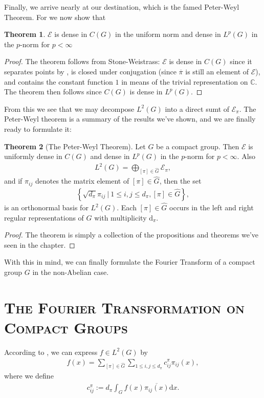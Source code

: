 \documentclass[10pt,twoside,openany,final]{memoir}
\newcommand{\sssection}[1]{%
\section[#1]{\centering\normalfont\scshape \textbf{#1}}}
\theoremstyle{definition}
\newtheorem{theorem}{Theorem}[chapter]
\theoremstyle{Break}
\newcommand{\C}{\mathbb{C}}
\newcommand{\G}{\widehat{G}}
\renewcommand{\d}{\mathrm{d}}
\begin{document}
Finally, we arrive nearly at our destination, which is the famed Peter-Weyl Theorem. For we now show that
\begin{theorem}
	$\mathcal{E}$ is dense in $C(G)$ in the uniform norm and dense in $L^p(G)$ in the $p$-norm for $p < \infty$	
	\label{5.11}
\end{theorem}
\begin{proof}
	The theorem follows from Stone-Weistrass: $\mathcal{E}$ is dense in $C(G)$ since it separates points by , is closed under conjugation (since $\overline{\pi}$ is still an element of $\mathcal{E}$), and contains the constant function $1$ in means of the trivial representation on $\C$. The theorem then follows since $C(G)$ is dense in $L^p(G)$.
\end{proof}
From this we see that we may decompose $L^2(G)$ into a direct sumt of $\mathcal{E}_\pi$. The Peter-Weyl theorem is a summary of the results we've shown, and we are finally ready to formulate it:
\begin{theorem}[The Peter-Weyl Theorem]
	Let $G$ be a compact group. Then $\mathcal{E}$ is uniformly dense in $C(G)$ and dense in $L^p(G)$ in the $p$-norm for $p < \infty$. Also
	\begin{align*}
		L^2(G) = \bigoplus_{[\pi] \in \G}\mathcal{E}_\pi,
	\end{align*}
	and if $\pi_{ij}$ denotes the matrix element of $[\pi]\in \G$, then the set
	\begin{align*}
		\left\{ \sqrt{d_{\pi}}\pi_{ij} \ \big| \ 1 \leq i , j \leq d_\pi , [\pi] \in \G \right\},	
	\end{align*}
	is an orthonormal basis for $L^2(G)$. Each $[\pi] \in \G$ occurs in the left and right regular representations of $G$ with multiplicity $\d_\pi$.
	\label{5.12}
\end{theorem}
\begin{proof}
	The theorem is simply a collection of the propositions and theorems we've seen in the chapter.
\end{proof}
With this in mind, we can finally formulate the Fourier Transform of a compact group $G$ in the non-Abelian case.
\sssection{The Fourier Transformation on Compact Groups}
According to , we can express $f \in L^2(G)$ by
\begin{align}
	f(x)=\sum_{[\pi] \in \G }\sum_{1\leq i,j \leq d_\pi}c_{ij}^\pi \pi_{ij}(x),
	\label{L2fcomp}
\end{align}
where we define 
\begin{align*}
	c_{ij}^\pi := d_\pi \int_{G}f(x) \overline{\pi_{ij}(x)} \d x.
\end{align*}
\end{document}
